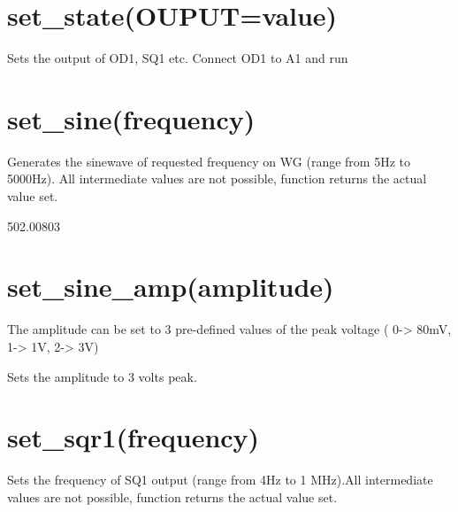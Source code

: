 \documentclass[a4paper,12pt,english]{sphinxmanual}
\begin{document}
\section{set\_state(OUPUT=value)}
\label{\detokenize{7.1:set-state-ouput-value}}
Sets the output of OD1, SQ1 etc. Connect OD1 to A1 and run

\begin{sphinxVerbatim}[commandchars=\\\{\}]
 
\end{sphinxVerbatim}


\section{set\_sine(frequency)}
\label{\detokenize{7.1:set-sine-frequency}}
Generates the sinewave of requested frequency on WG (range from 5Hz to
5000Hz). All intermediate values are not possible, function returns the
actual value set.

\begin{sphinxVerbatim}[commandchars=\\\{\}]
 
\end{sphinxVerbatim}

502.00803


\section{set\_sine\_amp(amplitude)}
\label{\detokenize{7.1:set-sine-amp-amplitude}}
The amplitude can be set to 3 pre-defined values of the peak voltage (
0-\textgreater{} 80mV, 1-\textgreater{} 1V, 2-\textgreater{} 3V)

\begin{sphinxVerbatim}[commandchars=\\\{\}]
\end{sphinxVerbatim}

Sets the amplitude to 3 volts peak.


\section{set\_sqr1(frequency)}
\label{\detokenize{7.1:set-sqr1-frequency}}
Sets the frequency of SQ1 output (range from 4Hz to 1 MHz).All
intermediate values are not possible, function returns the actual value
set.
\end{document}
